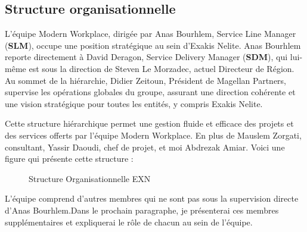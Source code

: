 \subsection{Structure organisationnelle}
L'équipe Modern Workplace, dirigée par Anas Bourhlem, Service Line Manager (\textbf{SLM}), occupe une position stratégique au sein d'Exakis Nelite. Anas Bourhlem reporte directement à David Deragon, Service Delivery Manager (\textbf{SDM}), qui lui-même est sous la direction de Steven Le Morzadec, actuel Directeur de Région.
Au sommet de la hiérarchie, Didier Zeitoun, Président de Magellan Partners, supervise les opérations globales du groupe, assurant une direction cohérente et une vision stratégique pour toutes les entités, y compris Exakis Nelite.

Cette structure hiérarchique permet une gestion fluide et efficace des projets et des services offerts par l'équipe Modern Workplace. En plus de Mauslem Zorgati, consultant, Yassir Daoudi, chef de projet, et moi Abdrezak Amiar. Voici une figure qui présente cette structure :

\begin{figure}[H]
	\begin{center}
		\caption{Structure Organisationnelle EXN}
	\end{center}
\end{figure}

L'équipe comprend d'autres membres qui ne sont pas sous la supervision directe d'Anas Bourhlem.Dans le prochain paragraphe, je présenterai ces membres supplémentaires et expliquerai le rôle de chacun au sein de l'équipe.
\newpage
